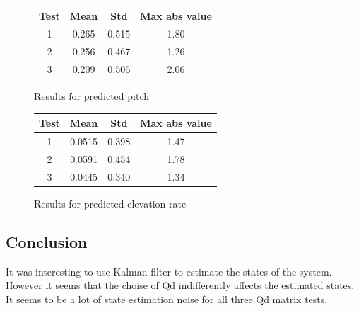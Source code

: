 \begin{figure}[h]
    \centering
    \begin{minipage}{0.45\textwidth} %
        \centering
        \begin{tabular}{||c c c c||} 
            \hline
            Test & Mean & Std & Max abs value \\ [0.5ex] 
            \hline\hline
            1 & 0.265 & 0.515 & 1.80  \\ 
            \hline
            2 & 0.256 & 0.467 & 1.26 \\
            \hline
            3 & 0.209 & 0.506 & 2.06  \\[1ex]
            \hline
        \end{tabular}
        \caption{Results for predicted pitch}
        \label{tab:res_lab4pich}
    \end{minipage}
    \hfill
    \begin{minipage}{0.45\textwidth} %
        \centering
        \begin{tabular}{||c c c c||} 
            \hline
            Test & Mean & Std & Max abs value \\ [0.5ex] 
            \hline\hline
            1 & 0.0515 & 0.398 & 1.47   \\ 
            \hline
            2 & 0.0591 & 0.454 & 1.78  \\
            \hline
            3 & 0.0445 & 0.340 & 1.34 \\[1ex]
            \hline
        \end{tabular}
        \caption{Results for predicted elevation rate}
        \label{tab:res_lab4elerate}
    \end{minipage}
\end{figure}


\subsection{Conclusion}
It was interesting to use Kalman filter to estimate the states of the system. However it seems that 
the choise of Qd indifferently affects the estimated states. It seems to be a lot of state estimation noise for all three Qd matrix tests.